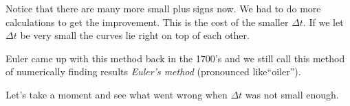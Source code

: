\documentclass{book}
\begin{document}
 
\begin{center}
\end{center}
Notice that there are many more small plus signs now. We had to do more
calculations to get the improvement. This is the cost of the smaller $\Delta
t.$ If we let $\Delta t$ be very small the curves lie right on top of each other.

 
\begin{center}
\end{center}
Euler came up with this method back in the 1700's and we still call this
method of numerically finding results \emph{Euler's method} (pronounced
like\textquotedblleft oiler\textquotedblright).

Let's take a moment and see what went wrong when $\Delta t$ was not small enough.
\end{document}
